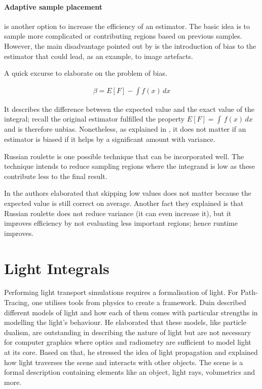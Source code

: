 \paragraph{Adaptive sample placement} is another option to increase the efficiency of an estimator.
The basic idea is to sample more complicated or contributing regions based on previous samples.
However, the main disadvantage pointed out by \cite{veach_robust_1997} is the introduction of bias to the estimator that could lead, as an example, to image artefacts.

A quick excurse to elaborate on the problem of bias.

\begin{align*}
\beta = E[F]-\int f(x)\,dx
\end{align*}

It describes the difference between the expected value and the exact value of the integral; recall the original estimator fulfilled the property $E[F]=\int\,f(x)\,dx$ and is therefore unbias.
Nonetheless, as explained in \cite{kalos_monte_2008}, it does not matter if an estimator is biased if it helps by a significant amount with variance.

Russian roulette is one possible technique that can be incorporated well.
The technique intends to reduce sampling regions where the integrand is low as these contribute less to the final result.

In \cite{pharr_physically_2017} the authors elaborated that skipping low values does not matter because the expected value is still correct on average.
Another fact they explained is that Russian roulette does not reduce variance (it can even increase it), but it improves efficiency by not evaluating less important regions; hence runtime improves.

\section{Light Integrals}

Performing light transport simulations requires a formalisation of light.
For Path-Tracing, one utilises tools from physics to create a framework.
Duin \cite{duin_beleuchtungsalgorithmen_1993} described different models of light and how each of them comes with particular strengths in modelling the light's behaviour.
He elaborated that these models, like particle dualism, are outstanding in describing the nature of light but are not necessary for computer graphics where optics and radiometry are sufficient to model light at its core.
Based on that, he stressed the idea of light propagation and explained how light traverses the scene and interacts with other objects.
The scene is a formal description containing elements like an object, light rays, volumetrics and more. 

